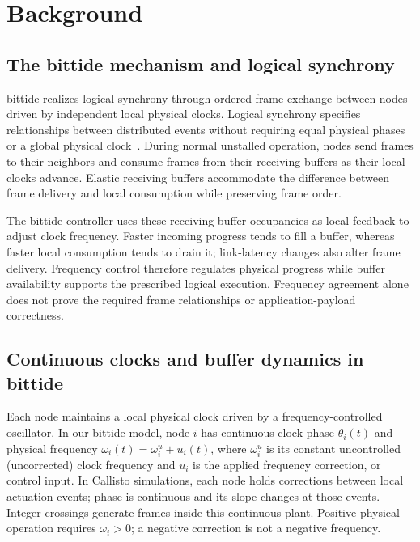 \section{Background}
\label{sec:background}

\subsection{The bittide mechanism and logical synchrony}
bittide realizes logical synchrony through ordered frame exchange
between nodes driven by independent local physical clocks. Logical
synchrony specifies relationships between distributed events without
requiring equal physical phases or a global physical clock~\cite{lall2024logicalSynchrony}.
During normal unstalled operation, nodes send frames to their neighbors
and consume frames from their receiving buffers as their local clocks
advance. Elastic receiving buffers accommodate the difference between
frame delivery and local consumption while preserving frame order.

The bittide controller uses these receiving-buffer occupancies as local
feedback to adjust clock frequency. Faster incoming progress tends to
fill a buffer, whereas faster local consumption tends to drain it;
link-latency changes also alter frame delivery. Frequency control
therefore regulates physical progress while buffer availability supports
the prescribed logical execution. Frequency agreement alone does not
prove the required frame relationships or application-payload correctness.

\subsection{Continuous clocks and buffer dynamics in bittide}

Each node maintains a local physical clock driven by a frequency-controlled oscillator.
In our bittide model, node $i$ has continuous clock phase $\theta_i(t)$ and physical frequency
$\omega_i(t)=\omega_i^u+u_i(t)$, where $\omega_i^u$ is its constant
uncontrolled (uncorrected) clock frequency and $u_i$ is the
applied frequency correction, or control input. In Callisto simulations, each node holds corrections between local actuation events; phase is continuous
and its slope changes at those events. Integer crossings generate
frames inside this continuous plant. Positive physical operation
requires $\omega_i>0$; a negative correction is not a negative frequency.

